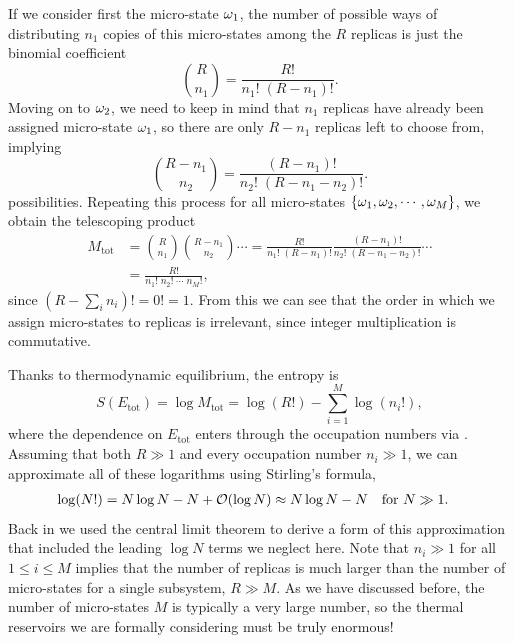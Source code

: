 If we consider first the micro-state $\omega_1$, the number of possible ways of distributing $n_1$ copies of this micro-states among the $R$ replicas is just the binomial coefficient
\begin{equation*}
  \binom{R}{n_1} = \frac{R!}{n_1! \; (R - n_1)!}.
\end{equation*}
Moving on to $\omega_2$, we need to keep in mind that $n_1$ replicas have already been assigned micro-state $\omega_1$, so there are only $R - n_1$ replicas left to choose from, implying
\begin{equation*}
  \binom{R - n_1}{n_2} = \frac{(R - n_1)!}{n_2! \; (R - n_1 - n_2)!}.
\end{equation*}
possibilities.
Repeating this process for all micro-states $\left\{\omega_1, \omega_2, \cdots, \omega_M\right\}$, we obtain the telescoping product
\begin{equation*}
  \begin{split}
    M_{\text{tot}} & = \binom{R}{n_1} \binom{R - n_1}{n_2} \cdots = \frac{R!}{n_1! \; (R - n_1)!} \frac{(R - n_1)!}{n_2! \; (R - n_1 - n_2)!} \cdots \\
                   & = \frac{R!}{n_1! \; n_2! \; \cdots \; n_M!},
  \end{split}
\end{equation*}
since $\left(R - \sum_i n_i \right)! = 0! = 1$.
From this we can see that the order in which we assign micro-states to replicas is irrelevant, since integer multiplication is commutative.

Thanks to thermodynamic equilibrium, the entropy is
\begin{equation*}
  S(E_{\text{tot}}) = \log M_{\text{tot}} = \log(R!) - \sum_{i = 1}^M \log(n_i!),
\end{equation*}
where the dependence on $E_{\text{tot}}$ enters through the occupation numbers via .
Assuming that both $R \gg 1$ and every occupation number $n_i \gg 1$, we can approximate all of these logarithms using Stirling's formula,
\begin{align*}
  \log(N!) & = N \log N - N + \mathcal O(\log N) \approx N \log N - N &
  \mbox{for } N & \gg 1.
\end{align*}
Back in  we used the central limit theorem to derive a form of this approximation that included the leading $\log N$ terms we neglect here.
Note that $n_i \gg 1$ for all $1 \leq i \leq M$ implies that the number of replicas is much larger than the number of micro-states for a single subsystem, $R \gg M$.
As we have discussed before, the number of micro-states $M$ is typically a very large number, so the thermal reservoirs we are formally considering must be truly enormous!

